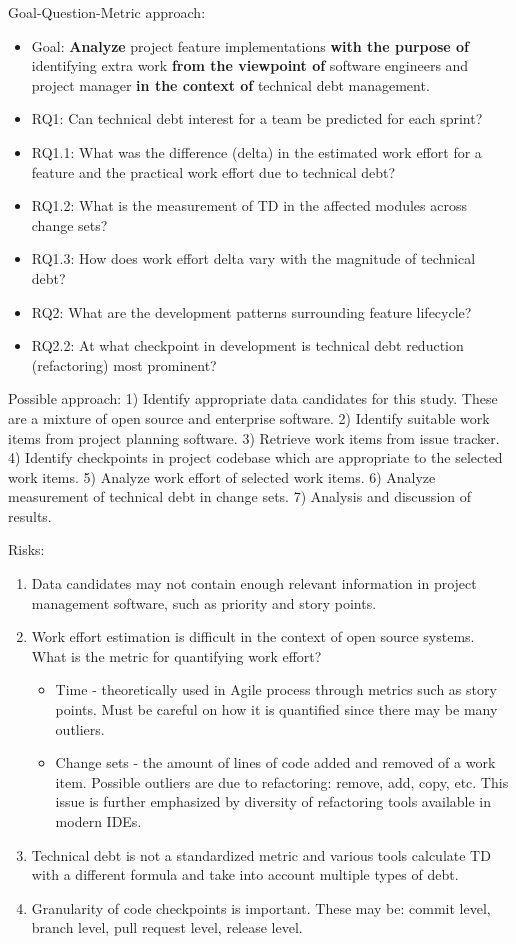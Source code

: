 \documentclass{mprop}
\begin{document}
Goal-Question-Metric approach:
\begin{itemize}
	\item Goal: \textbf{Analyze} project feature implementations \textbf{with the purpose of} identifying extra work \textbf{from the viewpoint of} software engineers and project manager \textbf{in the context of} technical debt management.
	\item RQ1: Can technical debt interest for a team be predicted for each sprint?
	\item RQ1.1: What was the difference (delta) in the estimated work effort for a feature and the practical work effort due to technical debt?
	\item RQ1.2: What is the measurement of TD in the affected modules across change sets?
	\item RQ1.3: How does work effort delta vary with the magnitude of technical debt?
	\item RQ2: What are the development patterns surrounding feature lifecycle?
	\item RQ2.2: At what checkpoint in development is technical debt reduction (refactoring)  most prominent?
\end{itemize}

Possible approach:
1) Identify appropriate data candidates for this study. These are a mixture of open source and enterprise software.
2) Identify suitable work items from project planning software.
3) Retrieve work items from issue tracker.
4) Identify checkpoints in project codebase which are appropriate to the selected work items.
5) Analyze work effort of selected work items.
6) Analyze measurement of technical debt in change sets.
7) Analysis and discussion of results.

Risks:
\begin{enumerate}
	\item Data candidates may not contain enough relevant information in project management software, such as priority and story points.
	\item Work effort estimation is difficult in the context of open source systems. What is the metric for quantifying work effort?
	      \begin{itemize}
		      \item Time - theoretically used in Agile process through metrics such as story points.
		            Must be careful on how it is quantified since there may be many outliers.
		      \item Change sets - the amount of lines of code added and removed of a work item.
		            Possible outliers are due to refactoring: remove, add, copy, etc.
		            This issue is further emphasized by diversity of refactoring tools available in modern IDEs.
	      \end{itemize}
	\item Technical debt is not a standardized metric and various tools calculate TD with a different formula and take into account multiple types of debt.
	\item Granularity of code checkpoints is important. These may be: commit level, branch level, pull request level, release level.
\end{enumerate}
\end{document}
